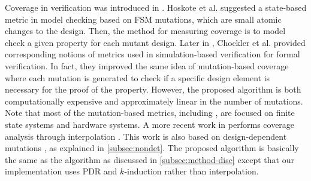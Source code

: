 Coverage in verification was introduced in \cite{hoskote1999coverage, katz1999have}. Hoskote et al. \cite{hoskote1999coverage} suggested a state-based metric in model checking based on FSM mutations, which are small atomic changes to the design. Then, the method for measuring coverage is to model check a given property for each mutant design.
Later in \cite{chockler_coverage_2003}, Chockler et al. provided corresponding notions of metrics used in simulation-based verification for formal verification. In fact, they improved the same idea of mutation-based coverage where each mutation is generated to check if a specific
design element is necessary for the proof of the property.
 However, the proposed algorithm is both computationally expensive and approximately linear
 in the number of mutations. Note that most of the mutation-based metrics, including \cite{kupferman_theory_2008, chockler2001practical}, are focused on finite state systems and hardware systems. A more recent work in \cite{chockler2010coverage} performs coverage analysis through interpolation \cite{mcmillan2003interpolation}. This work is also based on design-dependent mutations \cite{chockler_coverage_2003}, as explained in \ref{subsec:nondet}. The proposed algorithm is basically the same as the \mustalg algorithm as discussed in \ref{subsec:method-disc} except that our implementation uses PDR and $k$-induction rather than interpolation.

